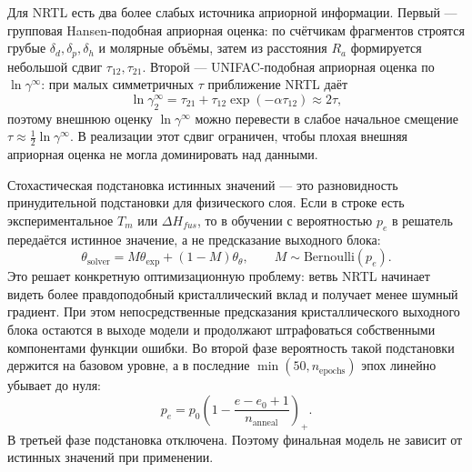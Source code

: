 \documentclass[11pt]{article}
\theoremstyle{definition}
\begin{document}
Для NRTL есть два более слабых источника априорной информации. Первый --- групповая Hansen-подобная априорная оценка: по счётчикам фрагментов строятся грубые $\delta_d,\delta_p,\delta_h$ и молярные объёмы, затем из расстояния $R_a$ формируется небольшой сдвиг $\tau_{12},\tau_{21}$. Второй --- UNIFAC-подобная априорная оценка по $\ln\gamma^\infty$: при малых симметричных $\tau$ приближение NRTL даёт
\begin{equation*}
    \ln\gamma_2^\infty
    =\tau_{21}+\tau_{12}\exp(-\alpha\tau_{12})
    \approx 2\tau,
\end{equation*}
поэтому внешнюю оценку $\ln\gamma^\infty$ можно перевести в слабое начальное смещение $\tau\approx\frac12\ln\gamma^\infty$. В реализации этот сдвиг ограничен, чтобы плохая внешняя априорная оценка не могла доминировать над данными.

Стохастическая подстановка истинных значений --- это разновидность принудительной подстановки для физического слоя. Если в строке есть экспериментальное $T_m$ или $\Delta H_{fus}$, то в обучении с вероятностью $p_e$ в решатель передаётся истинное значение, а не предсказание выходного блока:
\begin{equation*}
    \theta_{\mathrm{solver}}
    =M\theta_{\mathrm{exp}}+(1-M)\theta_\theta,
    \qquad M\sim\mathrm{Bernoulli}(p_e).
\end{equation*}
Это решает конкретную оптимизационную проблему: ветвь NRTL начинает видеть более правдоподобный кристаллический вклад и получает менее шумный градиент. При этом непосредственные предсказания кристаллического выходного блока остаются в выходе модели и продолжают штрафоваться собственными компонентами функции ошибки. Во второй фазе вероятность такой подстановки держится на базовом уровне, а в последние $\min(50,n_{\mathrm{epochs}})$ эпох линейно убывает до нуля:
\begin{equation*}
    p_e=p_0\left(1-
    \frac{e-e_0+1}{n_{\mathrm{anneal}}}
    \right)_+ .
\end{equation*}
В третьей фазе подстановка отключена. Поэтому финальная модель не зависит от истинных значений при применении.
\end{document}

